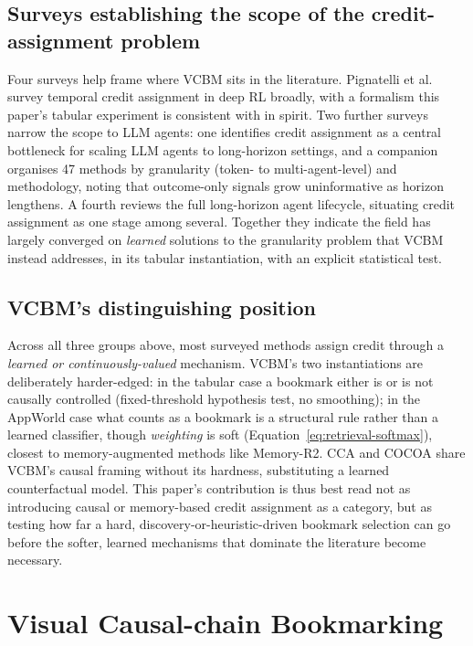 \documentclass[conference]{IEEEtran}
\begin{document}
\subsection{Surveys establishing the scope of the credit-assignment problem}
\label{sec:rw-surveys}

Four surveys help frame where VCBM sits in the literature. Pignatelli et al.\ \cite{b_pignatelli2023survey} survey temporal credit assignment in deep RL broadly, with a formalism this paper's tabular experiment is consistent with in spirit. Two further surveys narrow the scope to LLM agents: one \cite{b_agentic_rl_survey2026} identifies credit assignment as a central bottleneck for scaling LLM agents to long-horizon settings, and a companion \cite{b_agentic_ca_survey2026} organises 47 methods by granularity (token- to multi-agent-level) and methodology, noting that outcome-only signals grow uninformative as horizon lengthens. A fourth \cite{b_long_horizon_agents_survey2025} reviews the full long-horizon agent lifecycle, situating credit assignment as one stage among several. Together they indicate the field has largely converged on \emph{learned} solutions to the granularity problem that VCBM instead addresses, in its tabular instantiation, with an explicit statistical test.

\subsection{VCBM's distinguishing position}
\label{sec:rw-position}

Across all three groups above, most surveyed methods assign credit through a \emph{learned or continuously-valued} mechanism. VCBM's two instantiations are deliberately harder-edged: in the tabular case a bookmark either is or is not causally controlled (fixed-threshold hypothesis test, no smoothing); in the AppWorld case what counts as a bookmark is a structural rule rather than a learned classifier, though \emph{weighting} is soft (Equation~\eqref{eq:retrieval-softmax}), closest to memory-augmented methods like Memory-R2. CCA and COCOA share VCBM's causal framing without its hardness, substituting a learned counterfactual model. This paper's contribution is thus best read not as introducing causal or memory-based credit assignment as a category, but as testing how far a hard, discovery-or-heuristic-driven bookmark selection can go before the softer, learned mechanisms that dominate the literature become necessary.

\section{Visual Causal-chain Bookmarking}
\label{sec:technical-contribution}
\end{document}

